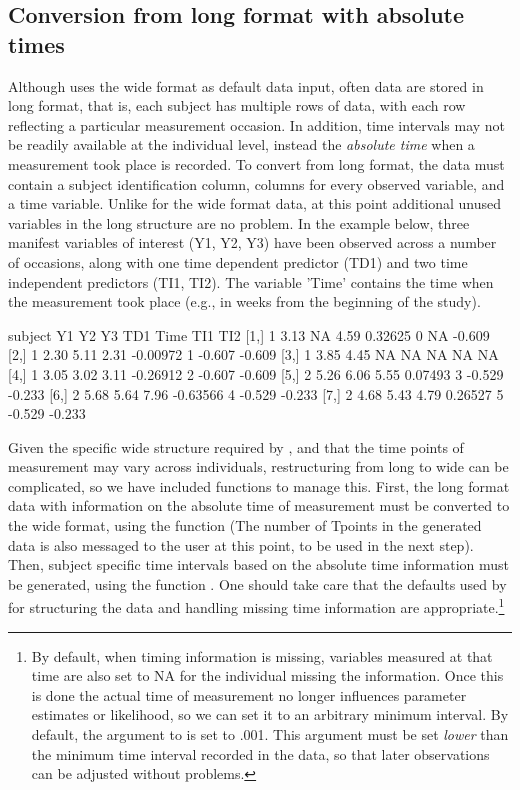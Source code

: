 \documentclass[nojss]{jss}\usepackage[]{graphicx}\usepackage[]{color}
\begin{document}
\subsection{Conversion from long format with absolute times} \label{sec:datalong}\nopagebreak 
Although  uses the wide format as default data input, often data are stored in long format, that is, each subject has multiple rows of data, with each row reflecting a particular measurement occasion. In addition, time intervals may not be readily available at the individual level, instead the \textit{absolute time} when a measurement took place is recorded. To convert from long format, the data must contain a subject identification column, columns for every observed variable, and a time variable. Unlike for the wide format data, at this point additional unused variables in the long structure are no problem. In the example below, three manifest variables of interest (Y1, Y2, Y3) have been observed across a number of occasions, along with one time dependent predictor (TD1) and two time independent predictors (TI1, TI2). The variable 'Time' contains the time when the measurement took place (e.g., in weeks from the beginning of the study). 

\begin{Schunk}
\begin{Soutput}
     subject   Y1   Y2   Y3      TD1 Time    TI1    TI2
[1,]       1 3.13   NA 4.59  0.32625    0     NA -0.609
[2,]       1 2.30 5.11 2.31 -0.00972    1 -0.607 -0.609
[3,]       1 3.85 4.45   NA       NA   NA     NA     NA
[4,]       1 3.05 3.02 3.11 -0.26912    2 -0.607 -0.609
[5,]       2 5.26 6.06 5.55  0.07493    3 -0.529 -0.233
[6,]       2 5.68 5.64 7.96 -0.63566    4 -0.529 -0.233
[7,]       2 4.68 5.43 4.79  0.26527    5 -0.529 -0.233
\end{Soutput}
\end{Schunk}

Given the specific wide structure required by , and that the time points of measurement may vary across individuals, restructuring from long to wide can be complicated, so we have included functions to manage this. First, the long format data with information on the absolute time of measurement must be converted to the wide format, using the  function (The number of Tpoints in the generated data is also messaged to the user at this point, to be used in the next step). Then, subject specific time intervals based on the absolute time information must be generated, using the function . One should take care that the defaults used by  for structuring the data and handling missing time information are appropriate.\footnote{By default, when timing information is missing, variables measured at that time are also set to NA for the individual missing the information. Once this is done the actual time of measurement no longer influences parameter estimates or likelihood, so we can set it to an arbitrary minimum interval. By default, the  argument to  is set to .001. This argument must be set \textit{lower} than the minimum time interval recorded in the data, so that later observations can be adjusted without problems.}
\end{document}
